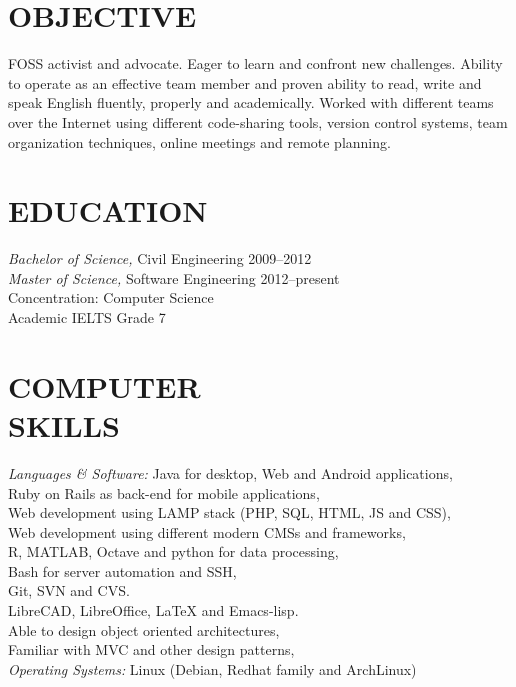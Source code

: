 \documentclass[margin, 10pt]{res} %
\begin{document}
\begin{resume}


\section{OBJECTIVE}
FOSS activist and advocate. Eager to learn and confront new challenges.
Ability to operate as an effective team member and
proven ability to read, write and speak English fluently, properly and academically.
Worked with different teams over the Internet using different code-sharing tools,
version control systems, team organization techniques, online meetings and remote
planning.

\section{EDUCATION}

{\sl Bachelor of Science,} Civil Engineering 2009--2012 \\
{\sl Master of Science,} Software Engineering 2012--present \\
Concentration: Computer Science \\
Academic IELTS Grade 7

\section{COMPUTER \\ SKILLS}

{\sl Languages \& Software:}
Java for desktop, Web and Android applications, \\
Ruby on Rails as back-end for mobile applications, \\
Web development using LAMP stack (PHP, SQL, HTML, JS and CSS), \\
Web development using different modern CMSs and frameworks, \\
R, MATLAB, Octave and python for data processing, \\
Bash for server automation and SSH, \\
Git, SVN and CVS. \\
LibreCAD, LibreOffice, LaTeX and Emacs-lisp. \\
Able to design object oriented architectures, \\
Familiar with MVC and other design patterns, \\
{\sl Operating Systems:} Linux (Debian, Redhat family and ArchLinux)
 

\end{resume}
\end{document}

